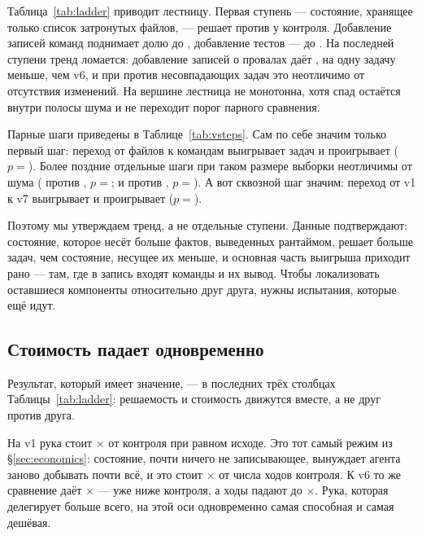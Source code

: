 

Таблица~\ref{tab:ladder} приводит лестницу. Первая ступень — состояние,
хранящее только список затронутых файлов, — решает \VRateVOne{} против
\VBaseRate{} у контроля. Добавление записей команд поднимает долю до
\VRateVThree, добавление тестов — до \VRateVSix. На последней ступени тренд
ломается: добавление записей о провалах даёт \VRateVSeven, на одну задачу
меньше, чем v6, и при \VStepVSixVSevenLo{} против \VStepVSixVSevenHi{}
несовпадающих задач это неотличимо от отсутствия изменений. На вершине
лестница не монотонна, хотя спад остаётся внутри полосы шума и не переходит
порог парного сравнения.

Парные шаги приведены в Таблице~\ref{tab:vsteps}. Сам по себе значим только
первый шаг: переход от файлов к командам выигрывает \VStepVOneVThreeHi{}
задач и проигрывает \VStepVOneVThreeLo{} ($p={}$\VStepVOneVThreeP). Более
поздние отдельные шаги при таком размере выборки неотличимы от шума
(\VStepVThreeVSixLo{} против \VStepVThreeVSixHi{}, $p={}$\VStepVThreeVSixP;
и \VStepVSixVSevenLo{} против \VStepVSixVSevenHi,
$p={}$\VStepVSixVSevenP). А вот сквозной шаг значим: переход от v1 к v7
выигрывает \VStepVOneVSevenHi{} и проигрывает \VStepVOneVSevenLo{}
($p={}$\VStepVOneVSevenP).

Поэтому мы утверждаем тренд, а не отдельные ступени. Данные подтверждают:
состояние, которое несёт больше фактов, выведенных рантаймом, решает больше
задач, чем состояние, несущее их меньше, и основная часть выигрыша приходит
рано — там, где в запись входят команды и их вывод. Чтобы локализовать
оставшиеся компоненты относительно друг друга, нужны испытания, которые ещё
идут.

\begin{table}[t]
\centering
\caption{Парные шаги вдоль лестницы, одна и та же задача и испытание.}
\label{tab:vsteps}

\end{table}

\subsection{Стоимость падает одновременно}

Результат, который имеет значение, — в последних трёх столбцах
Таблицы~\ref{tab:ladder}: решаемость и стоимость движутся вместе, а не друг
против друга.

На v1 рука стоит \VCostVOne$\times$ от контроля при равном исходе. Это тот
самый режим из \S\ref{sec:economics}: состояние, почти ничего не
записывающее, вынуждает агента заново добывать почти всё, и это стоит
\VTurnsVOne$\times$ от числа ходов контроля. К v6 то же сравнение даёт
\VCostVSix$\times$ — уже ниже контроля, а ходы падают до \VTurnsVSix$\times$.
Рука, которая делегирует больше всего, на этой оси одновременно самая
способная и самая дешёвая.

